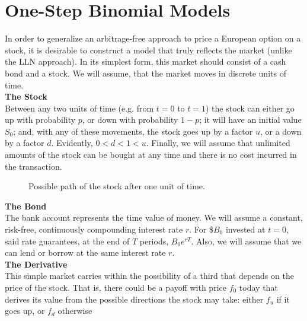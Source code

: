 \documentclass[../TGMAFFIRO.tex]{subfiles}
\begin{document}
\section{One-Step Binomial Models}
In order to generalize an arbitrage-free approach to price a European option on a stock, it is desirable to construct a model that truly reflects the market (unlike the LLN approach). In its simplest form, this market should consist of a cash bond and a stock. We will assume, that the market moves in discrete units of time.\\

\textbf{The Stock}\\
Between any two units of time (e.g. from $t=0$ to $t=1$) the stock can either go up with probability $p$, or down with probability $1-p$; it will have an initial value $S_0$; and, with any of these movements, the stock goes up by a factor $u$, or a down by a factor $d$. Evidently, $0 < d < 1 < u$. Finally, we will assume that unlimited amounts of the stock can be bought at any time and there is no cost incurred in the transaction.\\

\begin{figure}[h!]
\centering
{}
\caption{Possible path of the stock after one unit of time.}
\end{figure}

\textbf{The Bond}\\
The bank account represents the time value of money. We will assume a constant, risk-free, continuously compounding interest rate $r$. For $\$B_0$ invested at $t=0$, said rate guarantees, at the end of $T$ periods, $B_0 e^{rT}$. Also, we will assume that we can lend or borrow at the same interest rate $r$.\\

\textbf{The Derivative}\\
This simple market carries within the possibility of a third that depends on the price of the stock. That is, there could be a payoff with price $f_0$ today that derives its value from the possible directions the stock may take: either $f_u$ if it goes up, or $f_d$ otherwise
\end{document}
